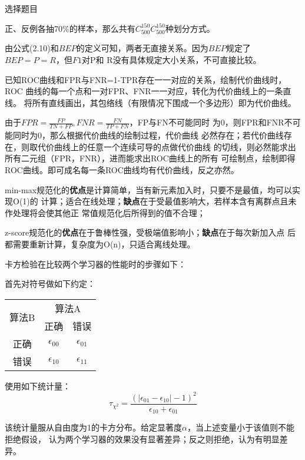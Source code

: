 \documentclass{ctexart}
\newcounter{answercnt}
\newcommand{\sCourse}{机器学习}   %
\newcommand{\nTime}{2}             %
\newcommand{\sName}{黄昊}           %
\newcommand{\sNumber}{20204205}     %
\newcommand{\homeworkTitle}{
    \setcounter{answercnt}{0}
    \begin{center}
        \fontsize{16pt}{0}{\textbf{\kaishu\sCourse课程\quad第\nTime次作业}}\\
        \fontsize{13pt}{0}{\textit{\kaishu\sName\qquad\sNumber}}\\
    \end{center}}
\begin{document}
    \homeworkTitle
    选择题目\answer[2.1]\answer[2.3]\answer[2.7]\answer[2.8]\answer[2.9]

    \answer[2.1]
    正、反例各抽70\%的样本，那么共有$C_{500}^{150}C_{500}^{150}$种划分方式。

    \answer[2.3]
    由公式(2.10)和$BEP$的定义可知，两者无直接关系。因为$BEP$规定了$BEP=P=R$，但$F1$对P和
    R没有具体规定大小关系，不可直接比较。

    \answer[2.7]
    已知ROC曲线和FPR与FNR=1-TPR存在一一对应的关系，绘制代价曲线时，ROC
    曲线的每一个点和一对FPR、FNR一一对应，转化为代价曲线上的一条直线。
    将所有直线画出，其包络线（有限情况下围成一个多边形）即为代价曲线。

    由于$FPR=\frac{FP}{TN+FP},FNR=\frac{FN}{TP+FN}$，FP与FN不可能同时
    为0，则FPR和FNR不可能同时为0，那么根据代价曲线的绘制过程，代价曲线
    必然存在；若代价曲线存在，则取代价曲线上的任意一个连续可导的点做代价曲线
    的切线，则必然能求出所有二元组（FPR，FNR），进而能求出ROC曲线上的所有
    可绘制点，绘制即得ROC曲线。即可成名每一条ROC曲线均有代价曲线，反之亦然。

    \answer[2.8]
    min-max规范化的\textbf{优点}是计算简单，当有新元素加入时，只要不是最值，均可以实现O(1)的
    计算；适合在线处理；\textbf{缺点}在于受最值影响大，若样本含有离群点且未作处理将会使其他正
    常值规范化后所得到的值不合理；

    z-score规范化的\textbf{优点}在于鲁棒性强，受极端值影响小；\textbf{缺点}在于每次新加入点
    后都需要重新计算，复杂度为O(n)，只适合离线处理。

    \answer[2.9]
    卡方检验在比较两个学习器的性能时的步骤如下：

    首先对符号做如下约定：
    \begin{table}[htbp]
        \centering
        \begin{tabular}{|c|c|c|}
            \hline
            \multirow{2}{*}{算法B}&\multicolumn{2}{c|}{算法A}\\
            \cline{2-3}
            &正确&错误\\
            \hline
            正确&$\epsilon_{00}$&$\epsilon_{01}$\\
            \hline
            错误&$\epsilon_{10}$&$\epsilon_{11}$\\
            \hline
        \end{tabular}
    \end{table}

    使用如下统计量：
    \begin{equation*}
        \tau_{\chi^2}=\frac{(|\epsilon_{01}-\epsilon_{10}|-1)^2}{\epsilon_{10}+\epsilon_{01}}
    \end{equation*}
    
    该统计量服从自由度为1的卡方分布。给定显著度$\alpha$，当上述变量小于该值则不能拒绝假设，
    认为两个学习器的效果没有显著差异；反之则拒绝，认为有明显差异。
    
\end{document}
